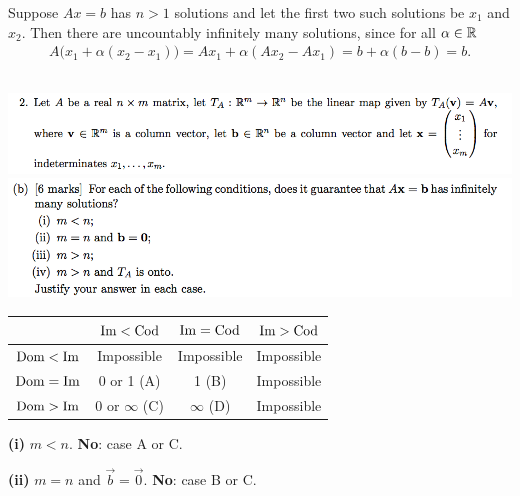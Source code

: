 \documentclass[12pt]{article}
\begin{document}
Suppose $Ax = b$ has $n > 1$ solutions and let the first two such solutions be
$x_1$ and $x_2$. Then there are uncountably infinitely many solutions, since
for all $\alpha \in \mathbb{R}$
\begin{align*}
A\Big(x_1 + \alpha (x_2 - x_1)\Big) = Ax_1 + \alpha(Ax_2 - Ax_1) = b + \alpha(b - b) = b.
\end{align*}

\newpage
\subsection*{} %
\begin{mdframed}
\includegraphics[width=400pt]{img/oxford-prelims-2017-A-2-2-0.png}\\
\includegraphics[width=400pt]{img/oxford-prelims-2017-A-2-2.png}
\end{mdframed}

\begin{table}[h]
  \centering
  \begin{tabular}{|c|c|c|c|}
    $          $ & $\operatorname{\mathrm{Im}} < \operatorname{\mathrm{Cod}}$      & $\operatorname{\mathrm{Im}} = \operatorname{\mathrm{Cod}}$   & $\operatorname{\mathrm{Im}} > \operatorname{\mathrm{Cod}}$\\
    \hline
    $\operatorname{\mathrm{Dom}} < \operatorname{\mathrm{Im}}$ & Impossible        & Impossible     & Impossible  \\
    $\operatorname{\mathrm{Dom}} = \operatorname{\mathrm{Im}}$ & 0 or 1 (A)        & 1 (B)          & Impossible  \\
    $\operatorname{\mathrm{Dom}} > \operatorname{\mathrm{Im}}$ & 0 or $\infty$ (C) & $\infty$ (D)   & Impossible  \\
  \end{tabular}
\end{table}

\textbf{(i)} $m < n$. \textbf{No}: case A or C.


\textbf{(ii)} $m = n$ and $\vec b = \vec 0$. \textbf{No}: case B or C.
\end{document}
